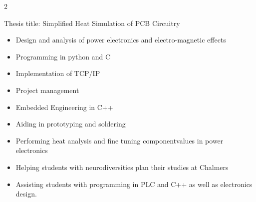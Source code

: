 \documentclass[10pt,a4paper,ragged2e,withhyper]{altacv}
\begin{document}
\begin{paracol}{2}

Thesis title: Simplified Heat Simulation of PCB Circuitry 

\begin{itemize}
\item Design and analysis of power electronics and electro-magnetic effects
\item Programming in python and C
\item Implementation of TCP/IP
\item Project management
\end{itemize}








\begin{itemize}
\item Embedded Engineering in C++ 
\item Aiding in prototyping and soldering
\end{itemize}

\divider

\begin{itemize}
\item Performing heat analysis and fine tuning componentvalues in power electronics
\end{itemize}

\divider

\begin{itemize}
    \item Helping students with neurodiversities plan their studies at Chalmers
\end{itemize}
\divider

\begin{itemize}
    \item Assisting students with programming in PLC and C++ as well as electronics design.
\end{itemize}


\end{paracol}
\end{document}
